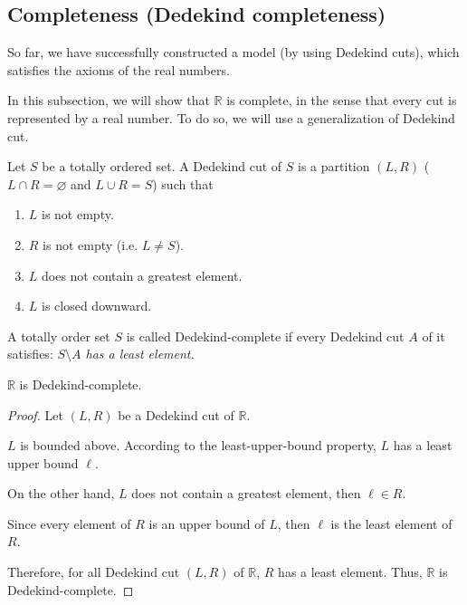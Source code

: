 \subsection{Completeness (Dedekind completeness)}

So far, we have successfully constructed a model (by using Dedekind cuts), which satisfies the axioms of the real numbers.

In this subsection, we will show that $\mathbb{R}$ is complete, in the sense that every cut is represented by a real number. To do so, we will use a generalization of Dedekind cut.

\begin{definition}
    Let $S$ be a totally ordered set. A Dedekind cut of $S$ is a partition $(L, R)$ ($L\cap R = \varnothing$ and $L\cup R = S$) such that
    \begin{enumerate}[label={(\roman*)}]
        \item $L$ is not empty.
        \item $R$ is not empty (i.e. $L\ne S$).
        \item $L$ does not contain a greatest element.
        \item $L$ is closed downward.
    \end{enumerate}
\end{definition}

\begin{definition}
    A totally order set $S$ is called Dedekind-complete if every Dedekind cut $A$ of it satisfies: \textit{$S\setminus A$ has a least element.}
\end{definition}

\begin{theorem}
    $\mathbb{R}$ is Dedekind-complete.
\end{theorem}

\begin{proof}
    Let $(L, R)$ be a Dedekind cut of $\mathbb{R}$.

    $L$ is bounded above. According to the least-upper-bound property, $L$ has a least upper bound $\ell$.

    On the other hand, $L$ does not contain a greatest element, then $\ell\in R$.

    Since every element of $R$ is an upper bound of $L$, then $\ell$ is the least element of $R$.

    Therefore, for all Dedekind cut $(L, R)$ of $\mathbb{R}$, $R$ has a least element. Thus, $\mathbb{R}$ is Dedekind-complete.
\end{proof}

